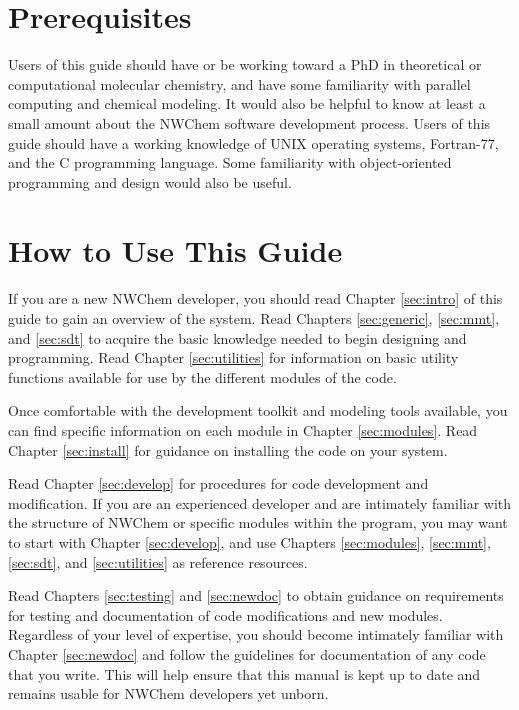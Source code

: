 \section*{Prerequisites}

Users of this guide should have or be working toward a PhD in theoretical or
computational molecular chemistry,
and have some familiarity with parallel computing and chemical modeling.  
It would also be helpful to know at least a small amount about the NWChem software 
development process.  Users of this guide should have a working knowledge of UNIX 
operating systems, Fortran-77, and the C programming language.  Some familiarity 
with object-oriented programming and design would also be useful.

\section*{How to Use This Guide}

If you are a new NWChem developer, you should read Chapter \ref{sec:intro}
of this guide to gain an overview of the system.  Read Chapters \ref{sec:generic},
\ref{sec:mmt}, and \ref{sec:sdt} to acquire the basic knowledge needed to begin designing 
and programming.  Read Chapter \ref{sec:utilities} for information on basic utility
functions available for use by the different modules of the code.

Once comfortable with the development toolkit and modeling
tools available, you can find specific information on each module in Chapter
\ref{sec:modules}.  Read Chapter \ref{sec:install} for guidance on installing the 
code on your system.  

Read Chapter \ref{sec:develop} for procedures for code
development and modification.
If you are an experienced developer and are intimately familiar with the structure 
of NWChem or specific modules within the program, you may want to start with 
Chapter \ref{sec:develop}, and use Chapters \ref{sec:modules}, 
\ref{sec:mmt}, \ref{sec:sdt}, and \ref{sec:utilities}
as reference resources.

Read Chapters \ref{sec:testing} and \ref{sec:newdoc} to obtain guidance on requirements
for testing and documentation of code modifications and new modules.
Regardless of your level of expertise, you should become 
intimately familiar with Chapter \ref{sec:newdoc}
and follow the guidelines for documentation of any code that you write.  This
will help ensure that this manual is kept up to date and remains usable for
NWChem developers yet unborn.

